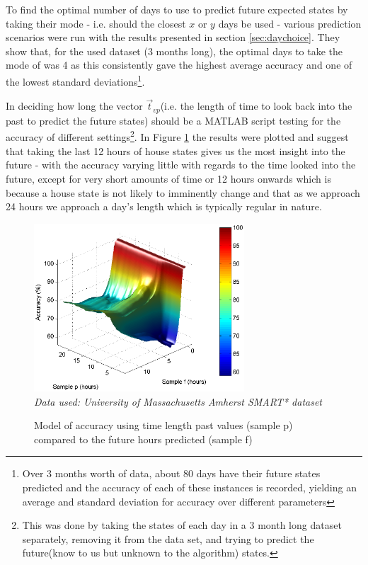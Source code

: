 \documentclass[10.5pt,a4paper,twoside]{report}   %
\begin{document}
To find the optimal number of days to use to predict future expected states by taking their mode - i.e. should the closest $x$ or $y$ days be used - various prediction scenarios were run with the results presented in section \ref{sec:daychoice}. They show that, for the used dataset (3 months long), the optimal days to take the mode of was 4 as this consistently gave the highest average accuracy and one of the lowest standard deviations\footnote{Over 3 months worth of data, about 80 days have their future states predicted and the accuracy of each of these instances is recorded, yielding an average and standard deviation for accuracy over different parameters}. 

In deciding how long the vector $\vec{t}_{vp}$(i.e. the length of time to look back into the past to predict the future states) should be a MATLAB script testing for the accuracy of different settings\footnote{This was done by taking the states of each day in a 3 month long dataset separately, removing it from the data set, and trying to predict the future(know to us but unknown to the algorithm) states.}. In Figure \ref{fig:predcons} the results were plotted and suggest that taking the last 12 hours of house states gives us the most insight into the future - with the accuracy varying little with regards to the time looked into the future, except for very short amounts of time or 12 hours onwards which is because a house state is not likely to imminently change and that as we approach 24 hours we approach a day's length which is typically regular in nature.


\begin{figure}[h!]
  \vspace{-10pt}
  \caption{Model of accuracy using time length past values (sample p) compared to the future hours predicted (sample f)}
  \centering
    \includegraphics[width=0.7\textwidth]{pred_consideration.eps}
\label{fig:predcons}
\\ \textit{Data used: University of Massachusetts Amherst SMART* dataset \cite{umasssmart}}
  \vspace{-20pt}
\end{figure}
\FloatBarrier
\end{document}
